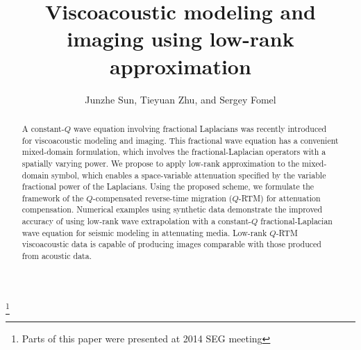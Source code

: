 \title{Viscoacoustic modeling and imaging using low-rank approximation}
\author{Junzhe Sun, Tieyuan Zhu, and Sergey Fomel}
\maketitle

\address{
\footnotemark[1]Bureau of Economic Geology \\
John A. and Katherine G. Jackson School of Geosciences \\
The University of Texas at Austin \\
University Station, Box X \\
Austin, TX 78713-8924 \\
}

\footnote{Parts of this paper were presented at 2014 SEG meeting}


\begin{abstract}
A constant-$Q$ wave equation involving fractional Laplacians was recently introduced for viscoacoustic modeling and imaging. This fractional wave equation has a convenient mixed-domain formulation, which involves the fractional-Laplacian operators with a spatially varying power. We propose to apply low-rank approximation to the mixed-domain symbol, which enables a space-variable attenuation specified by the variable fractional power of the Laplacians. Using the proposed scheme, we formulate the framework of the $Q$-compensated reverse-time migration ($Q$-RTM) for attenuation compensation. Numerical examples using synthetic data demonstrate the improved accuracy of using low-rank wave extrapolation with a constant-$Q$ fractional-Laplacian wave equation for seismic modeling in attenuating media. Low-rank $Q$-RTM  viscoacoustic data is capable of producing images comparable  with those produced from acoustic data.
\end{abstract}

